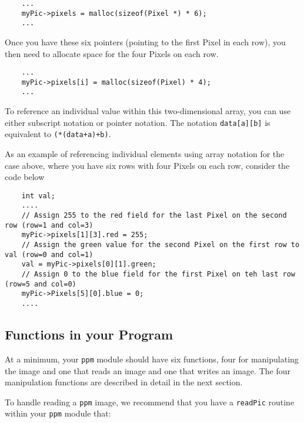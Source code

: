 \documentclass[12pt]{article}
\begin{document}
\begin{verbatim}
    ...
    myPic->pixels = malloc(sizeof(Pixel *) * 6);
    ...
\end{verbatim}

Once you have these six pointers (pointing to the first Pixel in each
row), you then need to allocate space for the four Pixels on each row.

\begin{verbatim}
    ...
    myPic->pixels[i] = malloc(sizeof(Pixel) * 4);
    ...
\end{verbatim}

To reference an individual value within this two-dimensional array,
you can use either subscript notation or pointer notation.  The
notation {\tt data[a][b]} is equivalent to {\tt *(*(data+a)+b)}.

As an example of referencing individual elements using array notation for the case above,
where you have six rows with four Pixels on each row, consider the code below

\begin{verbatim}
    int val;
    ....
    // Assign 255 to the red field for the last Pixel on the second row (row=1 and col=3)
    myPic->pixels[1][3].red = 255;
    // Assign the green value for the second Pixel on the first row to val (row=0 and col=1)
    val = myPic->pixels[0][1].green;
    // Assign 0 to the blue field for the first Pixel on teh last row (row=5 and col=0)
    myPic->Pixels[5][0].blue = 0;
    ....
\end{verbatim}

\subsection*{Functions in your Program}

At a minimum, your {\tt ppm} module should have six functions, four for
manipulating the image and one that reads an image and one that writes an image.
The four manipulation functions are described in detail in the next section.

To handle reading a {\tt ppm} image, we recommend that you have a
{\tt readPic} routine within your {\tt ppm} module that:
\end{document}

